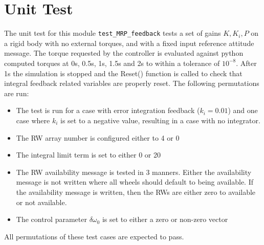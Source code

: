 \documentclass[]{BasiliskReportMemo}
\begin{document}
\section{Unit Test}
The unit test for this module \verb|test_MRP_feedback| tests a set of gains $K,K_i,P$ on a rigid body with no external torques, and with a fixed input reference attitude message. The torque requested by the controller is evaluated against python computed torques at 0s, 0.5s, 1s, 1.5s and 2s to within a tolerance of $10^{-8}$. After 1s the simulation is stopped and the Reset() function is called to check that integral feedback related variables are properly reset.  The following permutations are run:
\begin{itemize}
	\item The test is run for a case with error integration feedback ($k_i=0.01$) and one case where $k_i$ is set to a negative value, resulting in a case with no integrator. 
	\item The RW array number is configured either to 4 or 0
	\item The integral limit term is set to either 0 or 20
	\item The RW availability message is tested in 3 manners.  Either the availability  message is not written where all wheels should default to being available.  If the availability message is written, then the RWs are either zero to available or not available.
	\item The control parameter $\delta\omega_{0}$ is set to either a zero or non-zero vector
\end{itemize}
All permutations of these test cases are expected to pass.
\end{document}
